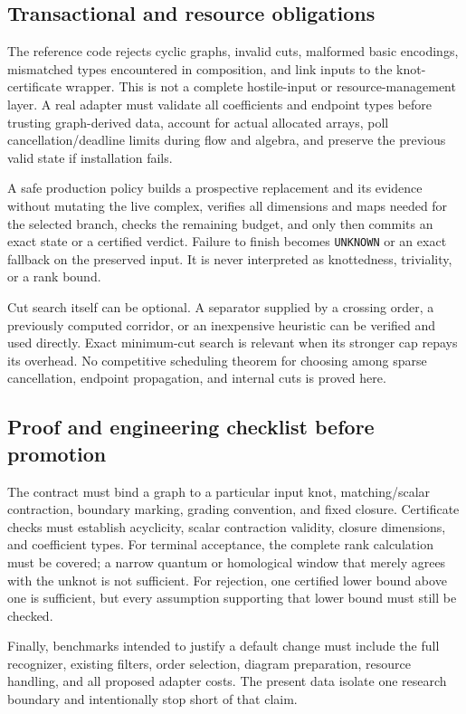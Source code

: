\documentclass[11pt,letterpaper]{article}
\theoremstyle{definition}\newtheorem{definition}[theorem]{Definition}
\theoremstyle{remark}\newtheorem{remark}[theorem]{Remark}
\newcommand{\code}[1]{\texttt{#1}}
\begin{document}
\subsection{Transactional and resource obligations}
The reference code rejects cyclic graphs, invalid cuts, malformed basic
encodings, mismatched types encountered in composition, and link inputs to
the knot-certificate wrapper. This is not a complete hostile-input or
resource-management layer. A real adapter must validate all coefficients
and endpoint types before trusting graph-derived data, account for actual
allocated arrays, poll cancellation/deadline limits during flow and algebra,
and preserve the previous valid state if installation fails.

A safe production policy builds a prospective replacement and its evidence
without mutating the live complex, verifies all dimensions and maps needed
for the selected branch, checks the remaining budget, and only then
commits an exact state or a certified verdict. Failure to finish becomes
\code{UNKNOWN} or an exact fallback on the preserved input. It is never
interpreted as knottedness, triviality, or a rank bound.

Cut search itself can be optional. A separator supplied by a crossing order,
a previously computed corridor, or an inexpensive heuristic can be verified
and used directly. Exact minimum-cut search is relevant when its stronger
cap repays its overhead. No competitive scheduling theorem for choosing
among sparse cancellation, endpoint propagation, and internal cuts is proved
here.

\subsection{Proof and engineering checklist before promotion}
The contract must bind a graph to a particular input knot, matching/scalar
contraction, boundary marking, grading convention, and fixed closure.
Certificate checks must establish acyclicity, scalar contraction validity,
closure dimensions, and coefficient types. For terminal acceptance, the
complete rank calculation must be covered; a narrow quantum or homological
window that merely agrees with the unknot is not sufficient. For rejection,
one certified lower bound above one is sufficient, but every assumption
supporting that lower bound must still be checked.

Finally, benchmarks intended to justify a default change must include the
full recognizer, existing filters, order selection, diagram preparation,
resource handling, and all proposed adapter costs. The present data isolate
one research boundary and intentionally stop short of that claim.
\end{document}
